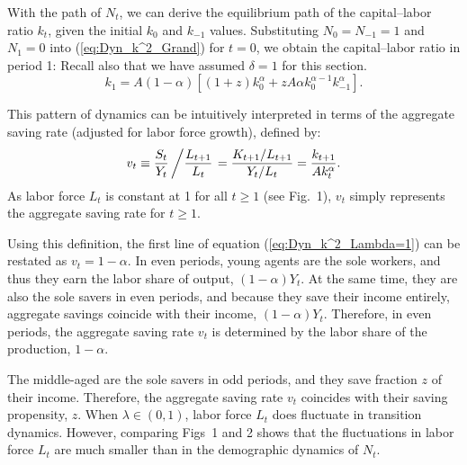 \documentclass[nogrid]{MBE}%
\begin{document}
{With the path of $N_{t}$, we can derive the equilibrium path of the capital--labor ratio $k_{t}$,
given the initial $k_{0}$ and $k_{-1}$ values. Substituting $N_{0}=N_{-1}=1$ and $N_{1}=0$ into
(\ref{eq:Dyn_k^2_Grand}) for $t=0$, we obtain the capital--labor ratio in period 1: {Recall also
that we have assumed $\delta=1$ for this section.}
\begin{equation}
k_{1}=A(1-\alpha)\left[  (1+z)k_{0}^{\alpha}+zA\alpha k_{0}^{\alpha-1}%
k_{-1}^{\alpha}\right]  . \label{eq:Dyn_k^2_Period1}%
\end{equation}


This pattern of dynamics can be intuitively interpreted in terms of the
aggregate saving rate (adjusted for labor force growth), defined by:
\begin{equation}
v_{t}\equiv\frac{S_{t}}{Y_{t}}\left/  \frac{L_{t+1}}{L_{t}}\right.  =
\frac{K_{t+1}/L_{t+1}}{Y_{t}/L_{t}} =\frac{k_{t+1}}{A k_{t}^{\alpha}}.
\label{eq:v}%
\end{equation}
As labor force $L_{t}$ is constant at 1 for all $t\geq1$ (see Fig.~1), $v_{t}$ simply represents
the aggregate saving rate for $t\geq1$.

Using this definition, the first line of equation (\ref{eq:Dyn_k^2_Lambda=1})
can be restated as $v_{t}=1-\alpha$. In even periods, young agents are the
sole workers, and thus they earn the labor share of output, $(1-\alpha) Y_{t}%
$. At the same time, they are also the sole savers in even periods, and
because they save their income entirely, aggregate savings coincide with their
income, $(1-\alpha)Y_{t}$. Therefore, in even periods, the aggregate saving
rate $v_{t}$ is determined by the labor share of the production, $1-\alpha$.

\begin{flthem}
The middle-aged are the sole savers in odd periods, and they save fraction $z$ of their income.
Therefore, the aggregate saving rate $v_{t}$ coincides with their saving propensity, $z$. {When
$\lambda\in(0,1)$, labor force $L_{t}$ does fluctuate in transition dynamics. However, comparing
Figs~1 and 2 shows that the fluctuations in labor force $L_{t}$ are much smaller than in the
demographic dynamics of $N_{t}$.}
\end{flthem}


}
\end{document}
